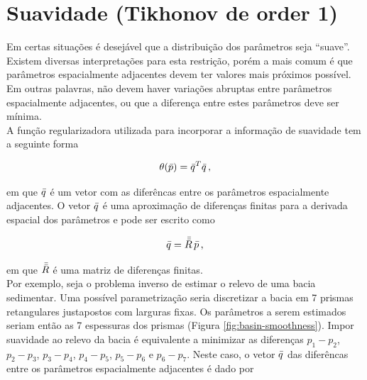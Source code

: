 \section{Suavidade (Tikhonov de order 1)}

Em certas situações é desejável que a distribuição dos parâmetros seja ``suave''.
Existem diversas interpretações para esta restrição, porém a mais comum é que
parâmetros espacialmente adjacentes devem ter valores mais próximos possível.
Em outras palavras, não devem haver variações abruptas entre parâmetros
espacialmente adjacentes, ou que a diferença entre estes parâmetros deve ser
mínima.
\\
\indent A função regularizadora utilizada para incorporar a informação de
suavidade tem a seguinte forma

\begin{equation}
\theta(\bar{p}) = \bar{q}^T\bar{q} \thinspace ,
\end{equation}

\noindent em que $\bar{q}$ é um vetor com as diferêncas entre os parâmetros
espacialmente adjacentes. O vetor $\bar{q}$ é uma aproximação de diferenças
finitas para a derivada espacial dos parâmetros e pode ser escrito como

\begin{equation}
\bar{q} = \bar{\bar{R}}\thinspace\bar{p} \thinspace ,
\end{equation}

\noindent em que $\bar{\bar{R}}$ é uma matriz de diferenças finitas.
\\
\indent Por exemplo, seja o problema inverso de estimar o relevo de uma bacia
sedimentar. Uma possível parametrização seria discretizar a bacia em 7 prismas
retangulares justapostos com larguras fixas. Os parâmetros a serem estimados
seriam então as 7 espessuras dos prismas (Figura \ref{fig:basin-smoothness}).
Impor suavidade ao relevo da bacia é equivalente a minimizar as diferenças
$p_1 - p_2$, $p_2 - p_3$, $p_3 - p_4$, $p_4 - p_5$, $p_5 - p_6$ e $p_6 - p_7$.
Neste caso, o vetor $\bar{q}$ das diferêncas entre os parâmetros espacialmente
adjacentes é dado por

